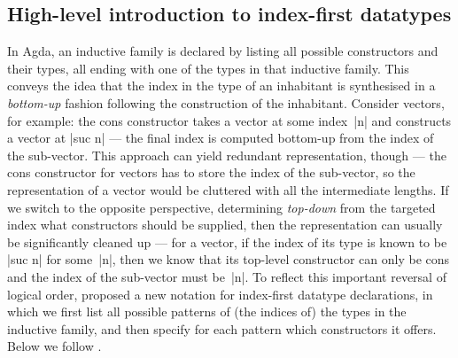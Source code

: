 
\subsection{High-level introduction to index-first datatypes}
\label{sec:index-first-datatypes}

In Agda, an inductive family is declared by listing all possible constructors and their types, all ending with one of the types in that inductive family.
This conveys the idea that the index in the type of an inhabitant is synthesised in a \emph{bottom-up} fashion following the construction of the inhabitant.
Consider vectors, for example: the cons constructor takes a vector at some index~|n| and constructs a vector at |suc n| --- the final index is computed bottom-up from the index of the sub-vector.
This approach can yield redundant representation, though --- the cons constructor for vectors has to store the index of the sub-vector, so the representation of a vector would be cluttered with all the intermediate lengths.
If we switch to the opposite perspective, determining \emph{top-down} from the targeted index what constructors should be supplied, then the representation can usually be significantly cleaned up --- for a vector, if the index of its type is known to be |suc n| for some~|n|, then we know that its top-level constructor can only be cons and the index of the sub-vector must be~|n|.
To reflect this important reversal of logical order, \citet{Dagand-functional-ornaments} proposed a new notation for index-first datatype declarations, in which we first list all possible patterns of (the indices of) the types in the inductive family, and then specify for each pattern which constructors it offers.
Below we follow .

